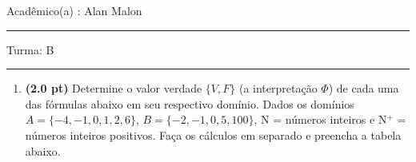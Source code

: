 \documentclass[a4paper,12pt]{article}
\begin{document}


\vskip 0.5cm Acad\^emico(a) : Alan Malon \rule{7cm}{0.4pt} Turma:  B \rule{1cm}{0.4pt}

\begin{enumerate}

%
%
%
%
%
%
%
%


\item {\bf (2.0 pt)} Determine o valor verdade $\{V, F \}$ (a interpretação $\Phi $)
de cada uma das fórmulas abaixo em seu respectivo domínio. Dados os domínios $A=\{-4, -1, 0, 1, 2, 6\}$, $B=\{-2, -1, 0, 5, 100\}$, N = números inteiros e N$^{+}$ = números inteiros positivos. Faça os cálculos em separado e preencha a tabela abaixo.


\end{enumerate}
\end{document}
